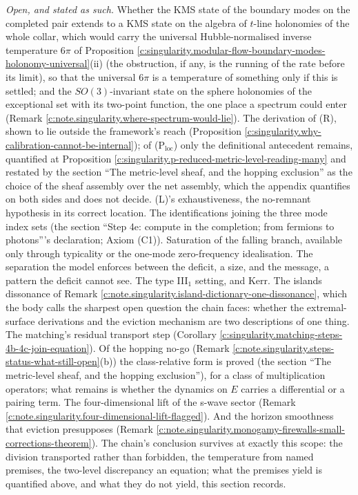 \documentclass[11pt]{article}
\theoremstyle{definition}
\theoremstyle{plain}
\begin{document}
\emph{Open, and stated as such.} Whether the KMS state of the boundary modes on the completed pair extends to a KMS state on the algebra of $t$-line holonomies of the whole collar, which would carry the universal Hubble-normalised inverse temperature $6\pi$ of Proposition \ref{c:singularity.modular-flow-boundary-modes-holonomy-universal}(ii) (the obstruction, if any, is the running of the rate before its limit), so that the universal $6\pi$ is a temperature of something only if this is settled; and the $SO(3)$-invariant state on the sphere holonomies of the exceptional set with its two-point function, the one place a spectrum could enter (Remark \ref{c:note.singularity.where-spectrum-would-lie}). The derivation of (R), shown to lie outside the framework's reach (Proposition \ref{c:singularity.why-calibration-cannot-be-internal}); of (P$_{\mathrm{loc}}$) only the definitional antecedent remains, quantified at Proposition \ref{c:singularity.p-reduced-metric-level-reading-many} and restated by the section ``The metric-level sheaf, and the hopping exclusion'' as the choice of the sheaf assembly over the net assembly, which the appendix quantifies on both sides and does not decide. (L)'s exhaustiveness, the no-remnant hypothesis in its correct location. The identifications joining the three mode index sets (the section ``Step 4e: compute in the completion; from fermions to photons'''s declaration; Axiom (C1)). Saturation of the falling branch, available only through typicality or the one-mode zero-frequency idealisation. The separation the model enforces between the deficit, a size, and the message, a pattern the deficit cannot see. The type III$_1$ setting, and Kerr. The islands dissonance of Remark \ref{c:note.singularity.island-dictionary-one-dissonance}, which the body calls the sharpest open question the chain faces: whether the extremal-surface derivations and the eviction mechanism are two descriptions of one thing. The matching's residual transport step (Corollary \ref{c:singularity.matching-steps-4b-4c-join-equation}). Of the hopping no-go (Remark \ref{c:note.singularity.steps-status-what-still-open}(b)) the class-relative form is proved (the section ``The metric-level sheaf, and the hopping exclusion''), for a class of multiplication operators; what remains is whether the dynamics on $E$ carries a differential or a pairing term. The four-dimensional lift of the s-wave sector (Remark \ref{c:note.singularity.four-dimensional-lift-flagged}). And the horizon smoothness that eviction presupposes (Remark \ref{c:note.singularity.monogamy-firewalls-small-corrections-theorem}). The chain's conclusion survives at exactly this scope: the division transported rather than forbidden, the temperature from named premises, the two-level discrepancy an equation; what the premises yield is quantified above, and what they do not yield, this section records.
\end{document}
